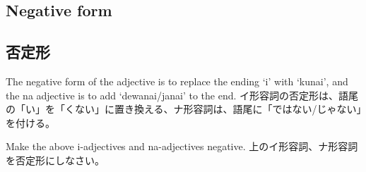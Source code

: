 \documentclass[uplatex,dvipdfmx,b5paper,english,10pt]{jsbook}
\begin{document}
\ifEnglish
\subsection{Negative form}
\else
\subsection{否定形}
\fi

\ifEnglish
The negative form of the adjective is to replace the ending `i' with `kunai', and the na adjective is to add `dewanai/janai' to the end.
\else
イ形容詞の否定形は、語尾の「い」を「くない」に置き換える、ナ形容詞は、語尾に「ではない/じゃない」を付ける。
\fi

\begin{toiquestion}
\ifEnglish
Make the above i-adjectives and na-adjectives negative.
\else
上のイ形容詞、ナ形容詞を否定形にしなさい。
\fi
\end{toiquestion}
\end{document}
